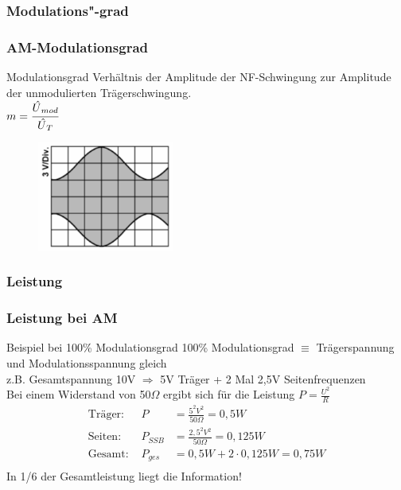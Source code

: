 \subsubsection{Modulations"-grad}

\begin{frame}
  \frametitle{AM-Modulationsgrad}

  \begin{block}{Modulationsgrad}
    Verhältnis der Amplitude der NF-Schwingung zur Amplitude der unmodulierten Trägerschwingung.\\
    $m = \cfrac{\skew{4}\hat{U}_{mod}}{\skew{4}\hat{U}_T}$
  \end{block}

  \begin{center}
    \begin{figure}
      \includegraphics[width=0.4\textwidth,height=.5\textheight,keepaspectratio]{a12/TE111.png}
    \end{figure}
  \end{center}
\end{frame}


\subsubsection{Leistung}

\begin{frame}
  \frametitle{Leistung bei AM}
  \begin{exampleblock}{Beispiel bei 100\% Modulationsgrad}
    100\% Modulationsgrad $\equiv$ Trägerspannung und Modulationsspannung gleich\\
    z.B. Gesamtspannung 10V $\Rightarrow$ 5V Träger + 2 Mal 2,5V Seitenfrequenzen\\
    Bei einem Widerstand von 50$\Omega$ ergibt sich für die Leistung $P = \frac{U^2}{R}$\\[.5em]
    \begin{align*}
      \text{Träger: } & P       &= \frac{5^2V^2}{50\Omega}   = 0,5W    \\
      \text{Seiten: } & P_{SSB} &= \frac{2,5^2V^2}{50\Omega} = 0,125W \\
      \text{Gesamt: } & P_{ges} &= 0,5W + 2 \cdot 0,125W           = 0,75W  \\
    \end{align*}
    In 1/6 der Gesamtleistung liegt die Information!
  \end{exampleblock}
\end{frame}


